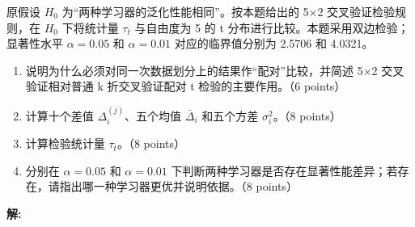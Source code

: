 \documentclass[8pt]{article}
\begin{document}
原假设 $H_0$ 为“两种学习器的泛化性能相同”。按本题给出的 5×2 交叉验证检验规则，在 $H_0$ 下将统计量 $\tau_t$ 与自由度为 5 的 t 分布进行比较。本题采用双边检验；显著性水平 $\alpha=0.05$ 和 $\alpha=0.01$ 对应的临界值分别为 2.5706 和 4.0321。

\begin{enumerate}[leftmargin=2.2em,itemsep=0.55em]
  \item 说明为什么必须对同一次数据划分上的结果作“配对”比较，并简述 5×2 交叉验证相对普通 k 折交叉验证配对 t 检验的主要作用。（6 points）
  \item 计算十个差值 $\Delta_i^{(j)}$、五个均值 $\bar{\Delta}_i$ 和五个方差 $\sigma_i^2$。（8 points）
  \item 计算检验统计量 $\tau_t$。（8 points）
  \item 分别在 $\alpha=0.05$ 和 $\alpha=0.01$ 下判断两种学习器是否存在显著性能差异；若存在，请指出哪一种学习器更优并说明依据。（8 points）
\end{enumerate}

\textbf{\large 解:}
\end{document}
